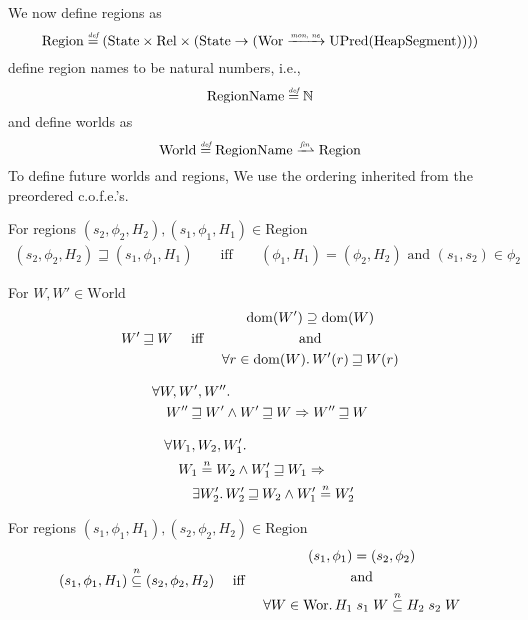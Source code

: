\documentclass{article}
\newcommand{\finparfun}{\xrightharpoonup{\textit{\tiny{fin}}}}
\newcommand{\monnefun}{\xrightarrow{\textit{\tiny{mon, ne}}}}
\newcommand{\fun}{\rightarrow}
\newcommand{\defeq}{\stackrel{\textit{\tiny{def}}}{=}}
\newcommand{\nequal}[1][n]{\stackrel{\tiny{#1}}{=}}
\newcommand{\nsubeq}[1][n]{\stackrel{\tiny{#1}}{\subseteq}}
\DeclareMathOperator{\dom}{dom}
\newcommand{\cofe}{c.o.f.e.}
\newcommand{\cofes}{\cofe{}'s}
\newcommand{\future}{\mathbin{\sqsupseteq}}
\newcommand{\plaindom}[1]{\mathrm{#1}}
\newcommand{\HeapSegments}{\plaindom{HeapSegment}}
\newcommand{\nats}{\mathbb{N}}
\newcommand{\Rel}{\plaindom{Rel}}
\newcommand{\States}{\plaindom{State}}
\newcommand{\RegionNames}{\plaindom{RegionName}}
\newcommand{\Regions}{\plaindom{Region}}
\newcommand{\Worlds}{\plaindom{World}}
\newcommand{\Wor}{\plaindom{Wor}}
\newcommand{\UPred}[1]{\plaindom{UPred}(#1)}
\begin{document}
We now define regions as
\[
\Regions \defeq (\States \times \Rel \times (\States \fun (\Wor \monnefun \UPred{\HeapSegments})))
\]
define region names to be natural numbers, i.e.,
\[
  \RegionNames \defeq \nats 
\]
and define worlds as
\[
\Worlds \defeq \RegionNames \finparfun \Regions
\]
To define future worlds and regions, We use the ordering inherited from the preordered \cofes{}.
\begin{definition}
For regions $(s_2,\phi_2,H_2), (s_1,\phi_1,H_1) \in \Regions$
  \begin{align*}
 (s_2,\phi_2,H_2) \future (s_1,\phi_1,H_1) &&\text{ iff } & &
(\phi_1,H_1) = (\phi_2,H_2) \text{ and } (s_1,s_2) \in \phi_2
  \end{align*}
\end{definition}

\begin{definition}
  For $W, W' \in \Worlds$
 \begin{align*}
 W' \future W & & \text{ iff } & &
   \begin{gathered}
     \dom(W') \supseteq \dom(W)\\ 
     \text{ and } \\
     \forall r \in \dom(W) \ldotp W'(r) \future W(r)
   \end{gathered}
 \end{align*}
\end{definition}

\begin{lemma}
\label{lem:future-worlds-trans}
  \begin{align*}
    & \forall W, W', W'' \ldotp \\
    & \quad  W'' \future W' \land W' \future W \Rightarrow W'' \future W
  \end{align*}
\end{lemma}

\begin{lemma}
\label{lem:nequal-and-future-world}
  \begin{align*}
    & \forall W_1,W_2,W_1' \ldotp \\
    & \quad W_1 \nequal W_2 \land W_1' \future W_1 \Rightarrow \\
    & \qquad \exists W_2' \ldotp W_2' \future W_2 \land W_1' \nequal W_2'
  \end{align*}
\end{lemma}

\begin{definition}
For regions $(s_1,\phi_1,H_1), (s_2,\phi_2,H_2) \in \Regions$
\begin{align*}
  (s_1,\phi_1,H_1) \nsubeq (s_2,\phi_2,H_2) & & \text{ iff } & &
  \begin{gathered}
    (s_1,\phi_1) = (s_2,\phi_2)\\
    \text{ and }\\
    \forall W \in \Wor \ldotp H_1 \; s_1 \; W \nsubeq H_2 \; s_2 \; W
  \end{gathered}
\end{align*}
\end{definition}
\end{document}
